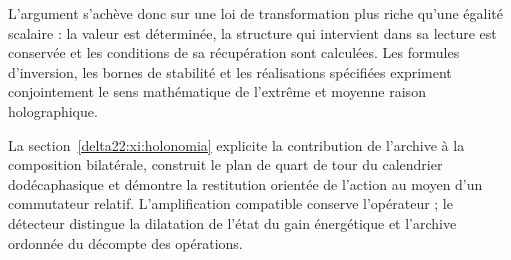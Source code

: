 L’argument s’achève donc sur une loi de transformation plus riche qu’une égalité scalaire : la valeur est déterminée, la structure qui intervient dans sa lecture est conservée et les conditions de sa récupération sont calculées. Les formules d’inversion, les bornes de stabilité et les réalisations spécifiées expriment conjointement le sens mathématique de l’extrême et moyenne raison holographique.

\par
La section~\ref{delta22:xi:holonomia} explicite la contribution de l'archive à la composition bilatérale, construit le plan de quart de tour du calendrier dodécaphasique et démontre la restitution orientée de l'action au moyen d'un commutateur relatif. L'amplification compatible conserve l'opérateur ; le détecteur distingue la dilatation de l'état du gain énergétique et l'archive ordonnée du décompte des opérations.
